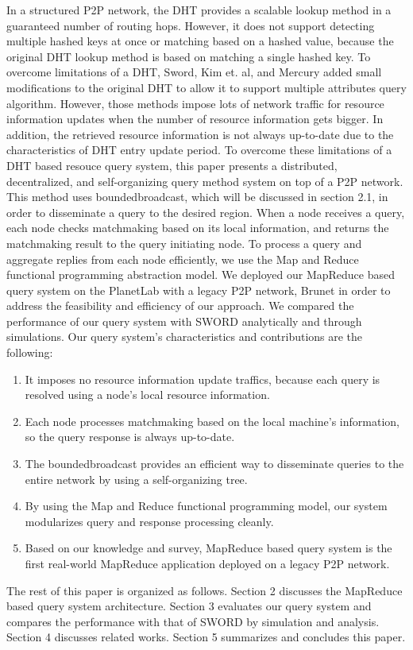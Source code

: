 \documentclass{acm_proc_article-sp}
\begin{document}
In a structured P2P network, the DHT provides a scalable lookup method in a guaranteed number of routing hops. 
However, it does not support detecting multiple hashed keys at once or matching based on a hashed value, because the original DHT lookup method is based on matching a single hashed key.
To overcome limitations of a DHT, Sword\cite{sword}, Kim et. al\cite{can_query}, and Mercury\cite{mercury} added small modifications to the original DHT to allow it to support multiple attributes query algorithm.
However, those methods impose lots of network traffic for resource information updates when the number of resource information gets bigger. 
In addition, the retrieved resource information is not always up-to-date due to the characteristics of DHT entry update period.
To overcome these limitations of a DHT based resouce query system, this paper presents a distributed, decentralized, and self-organizing query method system on top of a P2P network. 
This method uses boundedbroadcast, which will be discussed in section 2.1, in order to disseminate a query to the desired region.
When a node receives a query, each node checks matchmaking based on its local information, and returns the matchmaking result to the query initiating node.
To process a query and aggregate replies from each node efficiently, we use the Map and Reduce functional programming abstraction model.
We deployed our MapReduce based query system on the PlanetLab\cite{planetlab} with a legacy P2P network, Brunet\cite{brunet} in order to address the feasibility and efficiency of our approach. 
We compared the performance of our query system with SWORD\cite{sword} analytically and through simulations.
Our query system's characteristics and contributions are the following:
\begin{enumerate}
\setlength{\itemsep}{0pt}
\setlength{\parskip}{0pt}
\item It imposes no resource information update traffics, because each query is resolved using a node's local resource information.
\item Each node processes matchmaking based on the local machine's information, so the query response is always up-to-date.
\item The boundedbroadcast provides an efficient way to disseminate queries to the entire network by using a self-organizing tree.
\item By using the Map and Reduce functional programming model, our system modularizes query and response processing cleanly.
\item Based on our knowledge and survey, MapReduce based query system is the first real-world MapReduce application deployed on a legacy P2P network.
\end{enumerate}
The rest of this paper is organized as follows. 
Section 2 discusses the MapReduce based query system architecture. 
Section 3 evaluates our query system and compares the performance with that of SWORD by simulation and analysis. Section 4 discusses related works.
Section 5 summarizes and concludes this paper.
\end{document}
